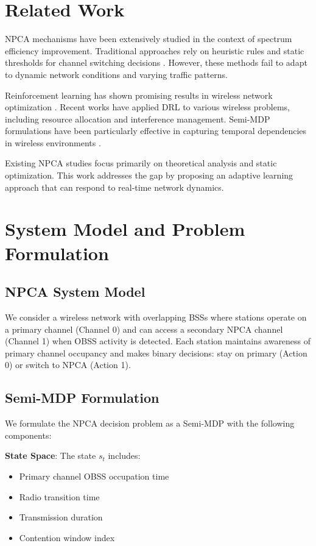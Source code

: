 \documentclass[conference]{IEEEtran}
\begin{document}
\section{Related Work}

NPCA mechanisms have been extensively studied in the context of spectrum efficiency improvement. Traditional approaches rely on heuristic rules and static thresholds for channel switching decisions \cite{wei2024optimized}. However, these methods fail to adapt to dynamic network conditions and varying traffic patterns.

Reinforcement learning has shown promising results in wireless network optimization \cite{mnih2013playing}. Recent works have applied DRL to various wireless problems, including resource allocation and interference management. Semi-MDP formulations have been particularly effective in capturing temporal dependencies in wireless environments \cite{sutton2018reinforcement}.

Existing NPCA studies focus primarily on theoretical analysis and static optimization. This work addresses the gap by proposing an adaptive learning approach that can respond to real-time network dynamics.

\section{System Model and Problem Formulation}

\subsection{NPCA System Model}

We consider a wireless network with overlapping BSSs where stations operate on a primary channel (Channel 0) and can access a secondary NPCA channel (Channel 1) when OBSS activity is detected. Each station maintains awareness of primary channel occupancy and makes binary decisions: stay on primary (Action 0) or switch to NPCA (Action 1).

\subsection{Semi-MDP Formulation}

We formulate the NPCA decision problem as a Semi-MDP with the following components:

\textbf{State Space}: The state $s_t$ includes:
\begin{itemize}
\item Primary channel OBSS occupation time
\item Radio transition time
\item Transmission duration
\item Contention window index
\end{itemize}
\end{document}
